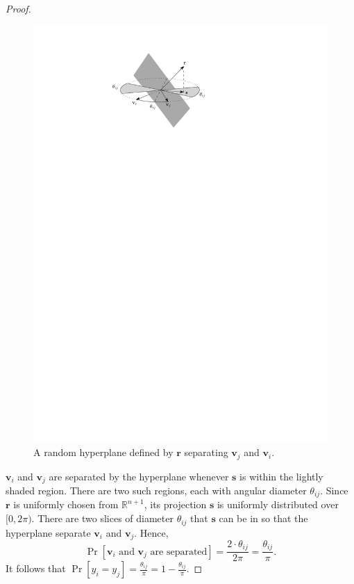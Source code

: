\begin{proof}
    \begin{figure}[htbp]
        \centering
        \includegraphics[width=0.4\linewidth]{hyperplane-rounding.pdf}
        \caption{A random hyperplane defined by $\mathbf{r}$ separating $\mathbf{v}_j$ and $\mathbf{v}_i$.}
    \end{figure}

    $\mathbf{v}_i$ and $\mathbf{v}_j$ are separated by the hyperplane whenever $\mathbf{s}$ is within the lightly shaded region. There are two such regions, each with angular diameter $\theta_{ij}$. Since $\mathbf{r}$ is uniformly chosen from $\mathbb{R}^{n+1}$, its projection $\mathbf{s}$ is uniformly distributed over $[0,2\pi)$. There are two slices of diameter $\theta_{ij}$ that $\mathbf{s}$ can be in so that the hyperplane separate $\mathbf{v}_i$ and $\mathbf{v}_j$. Hence,
    $$
    \Pr[\text{$\mathbf{v}_i$ and $\mathbf{v}_j$ are separated}] = \frac{2 \cdot \theta_{ij}}{2\pi} = \frac{\theta_{ij}}{\pi}.
    $$
    It follows that $\Pr[y_i = y_j] = \frac{\theta_{ij}}{\pi} = 1 - \frac{\theta_{ij}}{\pi}$. 
    

\end{proof}
